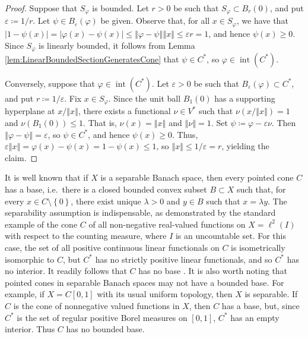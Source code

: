 \documentclass[10pt]{amsart}
\theoremstyle{definition}
\theoremstyle{remark}
\begin{document}
\begin{proof}
   Suppose that $S_{\varphi}$ is bounded.  Let $r > 0$ be such that
   $S_{\varphi} \subset B_{r}(0)$, and put ${\varepsilon} {\mathrel{\coloneqq}} 1/r$.
   Let $\psi \in B_{\varepsilon}({\varphi})$ be given.  Observe that, for
   all $x \in S_{\varphi}$, we have that ${\left\vert {1 - \psi(x)} \right\vert} =
   {\left\vert {{\varphi}(x) - \psi(x)} \right\vert} \le {\left\Vert {{\varphi} - \psi} \right\Vert} {\left\Vert {x} \right\Vert} \le
   {\varepsilon} r = 1$, and hence $\psi(x) \ge 0$.  Since $S_{\varphi}$
   is linearly bounded, it follows from Lemma
   \ref{lem:LinearBoundedSectionGeneratesCone} that $\psi \in
   {C^{\ast}}$, so ${\varphi} \in {\operatorname{int}}({C^{\ast}})$.
   
   Conversely, suppose that ${\varphi} \in {\operatorname{int}}({C^{\ast}})$.  Let
   ${\varepsilon} > 0$ be such that $B_{\varepsilon}({\varphi}) \subset {C^{\ast}}$, and put $r {\mathrel{\coloneqq}} 1/{\varepsilon}$.  Fix $x \in S_{\varphi}$.
   Since the unit ball $B_{1}(0)$ has a supporting hyperplane at
   $x / {\left\Vert {x} \right\Vert}$, there exists a functional $\nu \in {V^{\ast}}$
   such that $\nu(x / {\left\Vert {x} \right\Vert}) = 1$ and $\nu(B_{1}(0)) \le 1$.
   That is, $\nu(x) = {\left\Vert {x} \right\Vert}$ and ${\left\Vert {\nu} \right\Vert} = 1$.  Set $\psi
   {\mathrel{\coloneqq}} {\varphi} - {\varepsilon} \nu$.  Then ${\left\Vert {{\varphi} - \psi} \right\Vert} =
   {\varepsilon}$, so $\psi \in {C^{\ast}}$, and hence $\psi(x) \ge 0$.
   Thus, ${\varepsilon} {\left\Vert {x} \right\Vert} = {\varphi}(x) - \psi(x) = 1 - \psi(x) \le
   1$, so ${\left\Vert {x} \right\Vert} \le 1/{\varepsilon} = r$, yielding the claim.
\end{proof}

It is well known that if $ X $ is a separable Banach space, then
every pointed cone $ C $ has a base, i.e.~there is a closed
bounded convex subset $ B \subset X $ such that, for every $ x \in
C\setminus{\left\lbrace {0} \right\rbrace} $, there exist unique $ \lambda > 0 $ and $ y
\in B $ such that $ x = \lambda y $.  The separability assumption
is indispensable, as demonstrated by the standard example of the
cone $ C $ of all non-negative real-valued functions on $ X =
\ell^2 (I) $ with respect to the counting measure, where $I$ is an
uncountable set.  For this case, the set of all positive
continuous linear functionals on $ C $ is isometrically isomorphic
to $ C $, but $ C^{*} $ has no strictly positive linear
functionals, and so $ {{C}^{\ast}} $ has no interior.  It readily
follows that $ C $ has no base \cite{Jameson}.  It is also worth
noting that pointed cones in separable Banach spaces may not have
a bounded base.  For example, if $ X = C[0,1] $ with its usual
uniform topology, then $ X $ is separable.  If $ C $ is the cone
of nonnegative valued functions in $ X $, then $C$ has a base,
but, since $ C^{*} $ is the set of regular positive Borel measures
on $ [0,1] $, ${C^{\ast}}$ has an empty interior.  Thus $ C $ has no
bounded base.
\end{document}
